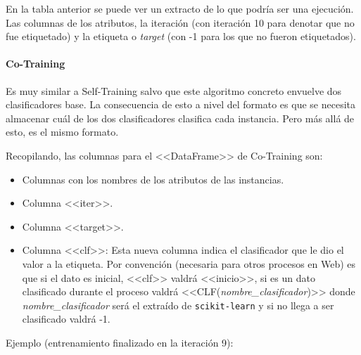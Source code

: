 En la tabla anterior se puede ver un extracto de lo que podría ser una
ejecución. Las columnas de los atributos, la iteración (con iteración 10 para
denotar que no fue etiquetado) y la etiqueta o \textit{target} (con -1 para los
que no fueron etiquetados).

\paragraph{Co-Training}
Es muy similar a Self-Training salvo que este algoritmo concreto envuelve dos
clasificadores base. La consecuencia de esto a nivel del formato es que se
necesita almacenar cuál de los dos clasificadores clasifica cada instancia. Pero
más allá de esto, es el mismo formato.

Recopilando, las columnas para el <<DataFrame>> de Co-Training son:
\begin{itemize}
    \item Columnas con los nombres de los atributos de las instancias.
    \item Columna <<iter>>.
    \item Columna <<target>>.
    \item Columna <<clf>>: Esta nueva columna indica el clasificador que le dio
    el valor  a la etiqueta. Por convención (necesaria para otros procesos en
    Web) es que si el dato es inicial, <<clf>> valdrá <<inicio>>, si es un dato
    clasificado durante el proceso valdrá <<CLF(\textit{nombre\_clasificador})>>
    donde \textit{nombre\_clasificador} será el extraído de \texttt{scikit-learn}
    y si no llega a ser clasificado valdrá -1.
\end{itemize}

Ejemplo (entrenamiento finalizado en la iteración 9):
\begin{table}[H]
    \caption{Ejemplo de DataFrame de Co-Training}
\end{table}


